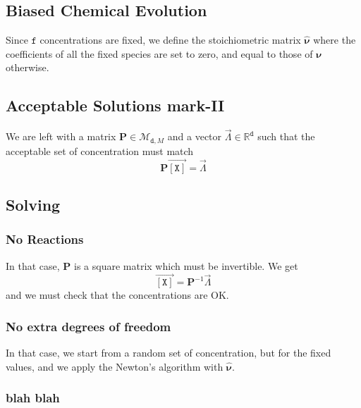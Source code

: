 \documentclass[aps,twocolumn]{revtex4}
\newcommand{\myconc}[1]{\left\lbrack #1 \right\rbrack}
\newcommand{\mychem}[1]{{\mathtt{#1}}}
\newcommand{\mymat}[1]{\boldsymbol{#1}}
\newcommand{\myvec}[1]{\overrightarrow{#1}}
\newcommand{\vecX}{\myvec{\myconc{\mychem{X}}}}
\newcommand{\dof}{\mathtt{d}}
\newcommand{\fixed}{\mathtt{f}}
\begin{document}

\subsection{Biased Chemical Evolution}
Since $\fixed$ concentrations are fixed, we define the stoichiometric matrix $\hat{\mymat{\nu}}$
where the coefficients of all the fixed species are set to zero, and equal to those of $\mymat{\nu}$ otherwise.

\subsection{Acceptable Solutions mark-II}
We are left with a matrix $\mymat{P}\in\mathcal{M}_{\dof,M}$ and a vector $\vec{\Lambda}\in\mathbb{R}^{\dof}$ such
that the acceptable set of concentration must match
\begin{equation}
	\mymat{P}\vecX = \vec{\Lambda}
\end{equation}

\subsection{Solving}
\subsubsection{No Reactions}
In that case, $\mymat{P}$ is a square matrix which must be invertible.
We get
$$
	\vecX = \mymat{P}^{-1}\vec{\Lambda}
$$
and we must check that the concentrations are OK.

\subsubsection{No extra degrees of freedom}
In that case, we start from a random set of concentration, but for the fixed values, and
we apply the Newton's algorithm with $\hat{\mymat{\nu}}$.

\subsubsection{blah blah}
\end{document}
